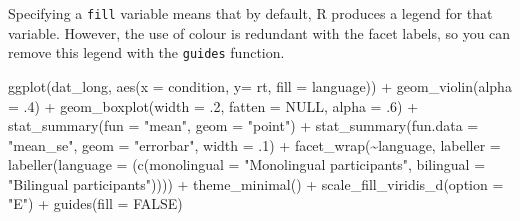 \documentclass[
  english,
  doc,floatsintext]{apa6}
\newenvironment{Shaded}{\begin{snugshade}}{\end{snugshade}}
\newcommand{\AttributeTok}[1]{\textcolor[rgb]{0.77,0.63,0.00}{#1}}
\newcommand{\ConstantTok}[1]{\textcolor[rgb]{0.00,0.00,0.00}{#1}}
\newcommand{\DecValTok}[1]{\textcolor[rgb]{0.00,0.00,0.81}{#1}}
\newcommand{\FunctionTok}[1]{\textcolor[rgb]{0.00,0.00,0.00}{#1}}
\newcommand{\NormalTok}[1]{#1}
\newcommand{\SpecialCharTok}[1]{\textcolor[rgb]{0.00,0.00,0.00}{#1}}
\newcommand{\StringTok}[1]{\textcolor[rgb]{0.31,0.60,0.02}{#1}}
\begin{document}
Specifying a \texttt{fill} variable means that by default, R produces a legend for that variable. However, the use of colour is redundant with the facet labels, so you can remove this legend with the \texttt{guides} function.

\begin{Shaded}
\begin{Highlighting}[]
\FunctionTok{ggplot}\NormalTok{(dat\_long, }\FunctionTok{aes}\NormalTok{(}\AttributeTok{x =}\NormalTok{ condition, }\AttributeTok{y=}\NormalTok{ rt, }\AttributeTok{fill =}\NormalTok{ language)) }\SpecialCharTok{+}
  \FunctionTok{geom\_violin}\NormalTok{(}\AttributeTok{alpha =}\NormalTok{ .}\DecValTok{4}\NormalTok{) }\SpecialCharTok{+}
  \FunctionTok{geom\_boxplot}\NormalTok{(}\AttributeTok{width =}\NormalTok{ .}\DecValTok{2}\NormalTok{, }\AttributeTok{fatten =} \ConstantTok{NULL}\NormalTok{, }\AttributeTok{alpha =}\NormalTok{ .}\DecValTok{6}\NormalTok{) }\SpecialCharTok{+}
  \FunctionTok{stat\_summary}\NormalTok{(}\AttributeTok{fun =} \StringTok{"mean"}\NormalTok{, }\AttributeTok{geom =} \StringTok{"point"}\NormalTok{) }\SpecialCharTok{+}
  \FunctionTok{stat\_summary}\NormalTok{(}\AttributeTok{fun.data =} \StringTok{"mean\_se"}\NormalTok{, }\AttributeTok{geom =} \StringTok{"errorbar"}\NormalTok{, }\AttributeTok{width =}\NormalTok{ .}\DecValTok{1}\NormalTok{) }\SpecialCharTok{+}
  \FunctionTok{facet\_wrap}\NormalTok{(}\SpecialCharTok{\textasciitilde{}}\NormalTok{language, }
             \AttributeTok{labeller =} \FunctionTok{labeller}\NormalTok{(}\AttributeTok{language =}\NormalTok{ (}\FunctionTok{c}\NormalTok{(}\AttributeTok{monolingual =} \StringTok{"Monolingual participants"}\NormalTok{, }\AttributeTok{bilingual =} \StringTok{"Bilingual participants"}\NormalTok{)))) }\SpecialCharTok{+}
  \FunctionTok{theme\_minimal}\NormalTok{() }\SpecialCharTok{+}
  \FunctionTok{scale\_fill\_viridis\_d}\NormalTok{(}\AttributeTok{option =} \StringTok{"E"}\NormalTok{) }\SpecialCharTok{+}
  \FunctionTok{guides}\NormalTok{(}\AttributeTok{fill =} \ConstantTok{FALSE}\NormalTok{)}
\end{Highlighting}
\end{Shaded}
\end{document}
